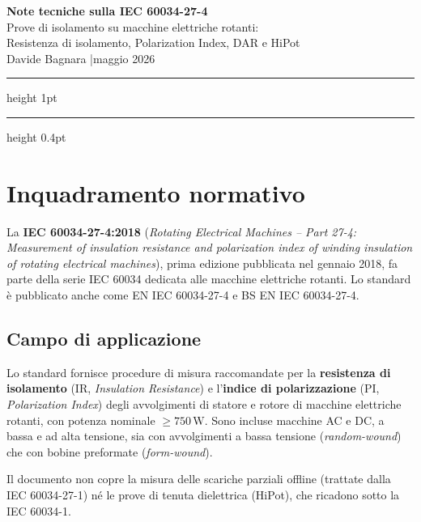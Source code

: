 \documentclass[a4paper,11pt]{article}
\begin{document}
\begin{center}
  {\LARGE\bfseries\color{leitnerblue}
    Note tecniche sulla IEC 60034-27-4}\\[6pt]
  {\large Prove di isolamento su macchine elettriche rotanti:\\
  Resistenza di isolamento, Polarization Index, DAR e HiPot}\\[10pt]
  {\normalsize Davide Bagnara \quad|\quad maggio 2026}
\end{center}

\vspace{4mm}
\hrule height 1pt
\vspace{6mm}

\tableofcontents
\vspace{6mm}
\hrule height 0.4pt
\vspace{4mm}

\section{Inquadramento normativo}

La \textbf{IEC 60034-27-4:2018} (\emph{Rotating Electrical Machines -- Part 27-4: Measurement of insulation resistance and polarization index of winding insulation of rotating electrical machines}), prima edizione pubblicata nel gennaio 2018, fa parte della serie IEC 60034 dedicata alle macchine elettriche rotanti. Lo standard è pubblicato anche come EN IEC 60034-27-4 e BS EN IEC 60034-27-4.

\subsection{Campo di applicazione}

Lo standard fornisce procedure di misura raccomandate per la \textbf{resistenza di isolamento} (IR, \emph{Insulation Resistance}) e l'\textbf{indice di polarizzazione} (PI, \emph{Polarization Index}) degli avvolgimenti di statore e rotore di macchine elettriche rotanti, con potenza nominale $\geq 750\,\text{W}$. Sono incluse macchine AC e DC, a bassa e ad alta tensione, sia con avvolgimenti a bassa tensione (\emph{random-wound}) che con bobine preformate (\emph{form-wound}).

Il documento non copre la misura delle scariche parziali offline (trattate dalla IEC 60034-27-1) né le prove di tenuta dielettrica (HiPot), che ricadono sotto la IEC 60034-1.
\end{document}
